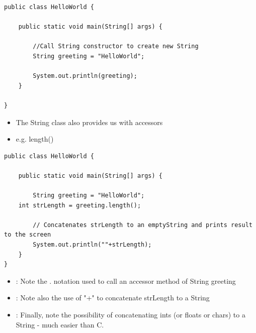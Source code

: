 \documentclass{beamer}
\begin{document}
\begin{frame}[fragile]
\begin{block}{}
\small
\begin{lstlisting}
public class HelloWorld {

    public static void main(String[] args) {
    	
    	//Call String constructor to create new String
    	String greeting = "HelloWorld";
    	
        System.out.println(greeting);
    }

}

\end{lstlisting}
\end{block}
\end{frame}

\begin{frame}[fragile]
\begin{itemize}
\item The String class also provides us with accessors 
\item e.g. length()
\end{itemize}
\begin{block}{}
\small
\begin{lstlisting}
public class HelloWorld {

    public static void main(String[] args) {
    	
    	String greeting = "HelloWorld";
	int strLength = greeting.length();
    	
        // Concatenates strLength to an emptyString and prints result to the screen
        System.out.println(""+strLength);
    }
}
\end{lstlisting}
\end{block}
\end{frame}

\begin{frame}[fragile]
\begin{itemize}
\item: Note the . notation used to call an accessor method of String greeting
\item: Note also the use of "+" to concatenate strLength to a String
\item: Finally, note the possibility of concatenating ints (or floats or chars) to a String - much easier than C.
\end{itemize}
\end{frame}
\end{document}

